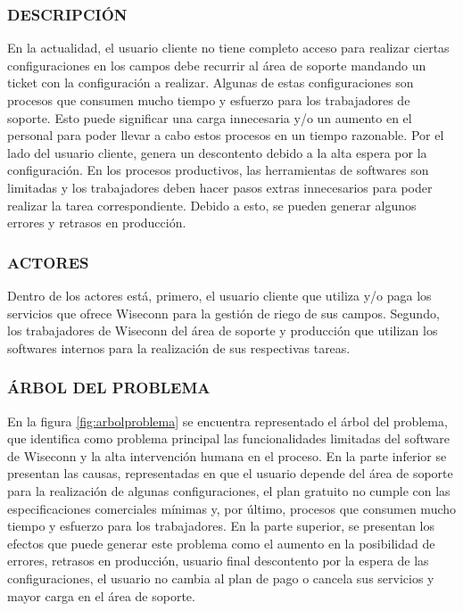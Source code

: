 \subsubsection{DESCRIPCIÓN}
En la actualidad, el usuario cliente no tiene completo acceso para realizar ciertas configuraciones en los campos debe recurrir al área de soporte mandando un ticket con la configuración a realizar. Algunas de estas configuraciones son procesos que consumen mucho tiempo y esfuerzo para los trabajadores de soporte. Esto puede significar una carga innecesaria y/o un aumento en el personal para poder llevar a cabo estos procesos en un tiempo razonable. Por el lado del usuario cliente, genera un descontento debido a la alta espera por la configuración.
En los procesos productivos, las herramientas de softwares son limitadas y los trabajadores deben hacer pasos extras innecesarios para poder realizar la tarea correspondiente. Debido a esto, se pueden generar algunos errores y retrasos en producción.
\iffalse Como se explicó anteriormente, Wiseconn ofrece planes gratuitos y de pago. En el caso del plan gratuito, este habilita un punto de entrada para aquellos usuarios que no están dispuestos a realizar pagos recurrentes. Sin embargo, existen limitaciones para el usuario cliente debido a la baja cantidad de funcionalidades y/o herramientas disponibles, lo que impide poder entregar condiciones mínimas al usuario que cumplan con las especificaciones comerciales. Además, puede influir en la poca retención de usuarios y/o que estos no se cambien a un plan de pago.\fi

\subsubsection{ACTORES}
Dentro de los actores está, primero, el usuario cliente que utiliza y/o paga los servicios que ofrece Wiseconn para la gestión de riego de sus campos. Segundo, los trabajadores de Wiseconn del área de soporte y producción que utilizan los softwares internos para la realización de sus respectivas tareas.

\subsubsection{ÁRBOL DEL PROBLEMA}
En la figura \ref{fig:arbolproblema} se encuentra representado el árbol del problema, que identifica como problema principal las funcionalidades limitadas del software de Wiseconn y la alta intervención humana en el proceso.
En la parte inferior se presentan las causas, representadas en que el usuario depende del área de soporte para la realización de algunas configuraciones, el plan gratuito no cumple con las especificaciones comerciales mínimas y, por último, procesos que consumen mucho tiempo y esfuerzo para los trabajadores.
En la parte superior, se presentan los efectos que puede generar este problema como el aumento en la posibilidad de errores, retrasos en producción, usuario final descontento por la espera de las configuraciones, el usuario no cambia al plan de pago o cancela sus servicios y mayor carga en el área de soporte.

